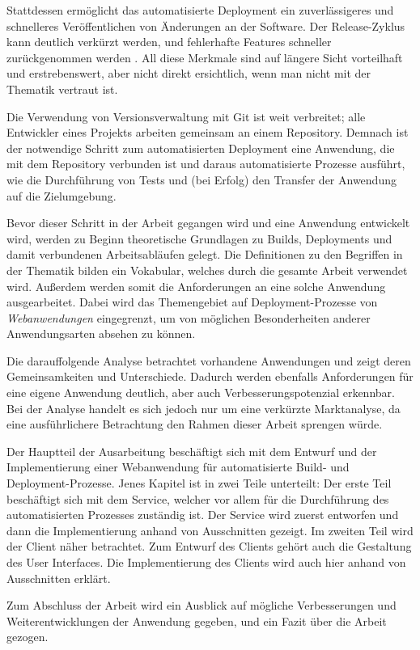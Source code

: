 Stattdessen ermöglicht das automatisierte Deployment ein zuverlässigeres und schnelleres Veröffentlichen von Änderungen an der Software. Der Release-Zyklus kann deutlich verkürzt werden, und fehlerhafte Features schneller zurückgenommen werden \citep[11f]{Humble2010}. All diese Merkmale sind auf längere Sicht vorteilhaft und erstrebenswert, aber nicht direkt ersichtlich, wenn man nicht mit der Thematik vertraut ist.

Die Verwendung von Versionsverwaltung mit Git ist weit verbreitet; alle Entwickler eines Projekts arbeiten gemeinsam an einem Repository. Demnach ist der notwendige Schritt zum automatisierten Deployment eine Anwendung, die mit dem Repository verbunden ist und daraus automatisierte Prozesse ausführt, wie die Durchführung von Tests und (bei Erfolg) den Transfer der Anwendung auf die Zielumgebung.

Bevor dieser Schritt in der Arbeit gegangen wird und eine Anwendung entwickelt wird, werden zu Beginn theoretische Grundlagen zu Builds, Deployments und damit verbundenen Arbeitsabläufen gelegt. Die Definitionen zu den Begriffen in der Thematik bilden ein Vokabular, welches durch die gesamte Arbeit verwendet wird. Außerdem werden somit die Anforderungen an eine solche Anwendung ausgearbeitet. Dabei wird das Themengebiet auf Deployment-Prozesse von \emph{Webanwendungen} eingegrenzt, um von möglichen Besonderheiten anderer Anwendungsarten absehen zu können.

Die darauffolgende Analyse betrachtet vorhandene Anwendungen und zeigt deren Gemeinsamkeiten und Unterschiede. Dadurch werden ebenfalls Anforderungen für eine eigene Anwendung deutlich, aber auch Verbesserungspotenzial erkennbar. Bei der Analyse handelt es sich jedoch nur um eine verkürzte Marktanalyse, da eine ausführlichere Betrachtung den Rahmen dieser Arbeit sprengen würde.

Der Hauptteil der Ausarbeitung beschäftigt sich mit dem Entwurf und der Implementierung einer Webanwendung für automatisierte Build- und De\-ploy\-ment-Prozesse. Jenes Kapitel ist in zwei Teile unterteilt: Der erste Teil beschäftigt sich mit dem Service, welcher vor allem für die Durchführung des automatisierten Prozesses zuständig ist. Der Service wird zuerst entworfen und dann die Implementierung anhand von Ausschnitten gezeigt. Im zweiten Teil wird der Client näher betrachtet. Zum Entwurf des Clients gehört auch die Gestaltung des User Interfaces. Die Implementierung des Clients wird auch hier anhand von Ausschnitten erklärt.

Zum Abschluss der Arbeit wird ein Ausblick auf mögliche Verbesserungen und Weiterentwicklungen der Anwendung gegeben, und ein Fazit über die Arbeit gezogen.
